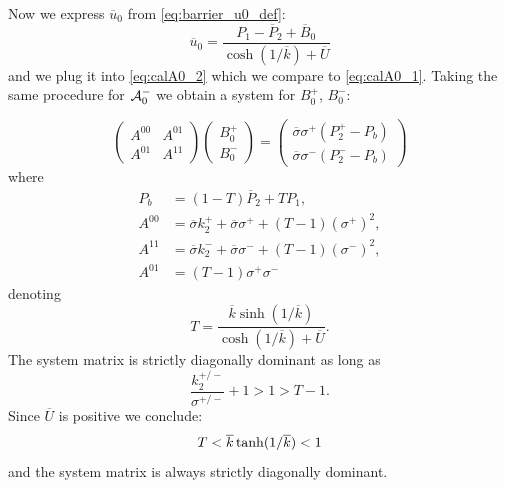 \documentclass[a4paper,10pt]{article}
\def\ol#1{\overline{#1}}
\begin{document}
Now we express $\ol{u}_0$ from \eqref{eq:barrier_u0_def}:
\begin{equation}
    \label{eq:barrier_u0}
    \ol{u}_0 = \frac{P_1 - \ol{P}_2 + \ol{B}_0}{\cosh(1/\ol{k}) + \ol{U}}
\end{equation}
and we plug it into  \eqref{eq:calA0_2} which we compare to \eqref{eq:calA0_1}. Taking the same procedure for ${\cal A}_0^-$ we
obtain a system for $B_0^+$, $B_0^-$:

\begin{equation}
    \label{eq:B0_system}
    \begin{pmatrix} 
            A^{00} & A^{01} \\ 
            A^{01} & A^{11}
    \end{pmatrix}
    \begin{pmatrix} 
        B_0^+  \\ 
        B_0^-     
    \end{pmatrix}
     =  
    \begin{pmatrix} 
        \ol{\sigma}\sigma^+(P^+_2 - P_b) \\ 
        \ol{\sigma}\sigma^-(P^-_2 - P_b)
    \end{pmatrix}
\end{equation}
where
\begin{align}
    P_b &= (1-T) \ol{P}_2 + T P_1, \\
    A^{00} &= \ol{\sigma}k_2^+  + \ol{\sigma}\sigma^+ +(T-1)(\sigma^+)^2, \\
    A^{11} &= \ol{\sigma}k_2^-  + \ol{\sigma}\sigma^- +(T-1)(\sigma^-)^2, \\
    A^{01} &= (T-1)\sigma^+\sigma^-    
\end{align}
denoting
\[
    T  = \frac{\ol{k}\sinh( 1/\ol{k} )}{\cosh(1/\ol{k}) + \ol{U}}.
\]
The system matrix is strictly diagonally dominant as long as 
\[
    \frac{k_2^{+/-}}{\sigma^{+/-}} + 1 > 1 > T -1.
\]
Since $\ol{U}$ is positive we conclude:
\[
    T < \ol{k}\, {\rm tanh}( 1/\ol{k} ) < 1
\]
and the system matrix is always strictly diagonally dominant.


% 
% 
% 
% 
% 
\end{document}
